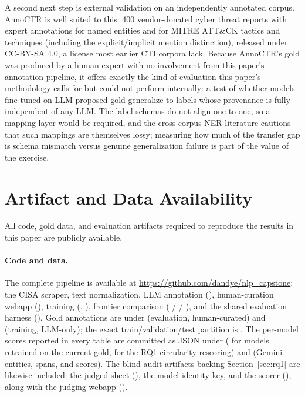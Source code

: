 \documentclass[11pt]{article}
\begin{document}
A second next step is external validation on an independently annotated
corpus. AnnoCTR \citep{lange2024annoctr} is well suited to this: 400
vendor-donated cyber threat reports with expert annotations for named
entities and for MITRE ATT\&CK tactics and techniques (including the
explicit/implicit mention distinction), released under CC-BY-SA 4.0, a
license most earlier CTI corpora lack. Because AnnoCTR's gold was
produced by a human expert with no involvement from this paper's
annotation pipeline, it offers exactly the kind of evaluation this
paper's methodology calls for but could not perform internally: a test
of whether models fine-tuned on LLM-proposed gold generalize to labels
whose provenance is fully independent of any LLM. The label schemas do
not align one-to-one, so a mapping layer would be required, and the
cross-corpus NER literature cautions that such mappings are themselves
lossy; measuring how much of the transfer gap is schema mismatch versus
genuine generalization failure is part of the value of the exercise.

\section{Artifact and Data Availability}
\label{sec:artifacts}

All code, gold data, and evaluation artifacts required to reproduce the
results in this paper are publicly available.

\begingroup\sloppy

\paragraph{Code and data.} The complete pipeline is available at
\url{https://github.com/dandye/nlp_capstone}: the CISA scraper, text
normalization, LLM annotation (), human-curation
webapp (), training
(, ), frontier
comparison ( /  /
), and the shared evaluation harness
(). Gold annotations are under
 (evaluation, human-curated) and
 (training, LLM-only); the exact
train/validation/test partition is .
The per-model scores reported in every table are committed as JSON under
 ( for models
retrained on the current gold,  for the RQ1
circularity rescoring) and  (Gemini
entities, spans, and scores). The blind-audit artifacts backing
Section~\ref{sec:rq1} are likewise included: the judged sheet
(), the model-identity key, and the
scorer (), along with the
judging webapp ().
\end{document}
